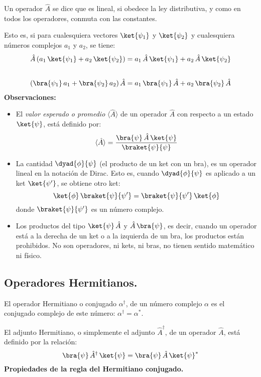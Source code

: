 Un operador $\hat{A}$ se dice que es lineal, si obedece la ley distributiva, y como en todos los operadores, conmuta con las constantes.
\par
Esto es, si para cualesquiera vectores $\ket{\psi_{1}}$ y $\ket{\psi_{2}}$ y cualesquiera números complejos $a_{1}$ y $a_{2}$, se tiene:
\begin{align}
\hat{A} \, (a_{1} \, \ket{\psi_{1}} + a_{2} \, \ket{\psi_{2}}) &= a_{1} \, \hat{A} \, \ket{\psi_{1}} + a_{2} \, \hat{A} \, \ket{\psi_{2}} \label{eq:ecuacion_02_56} \\[1.75em]
( \bra{\psi_{1}} \, a_{1} +  \bra{\psi_{2}} \, a_{2}) \, \hat{A} &= a_{1} \, \bra{\psi_{1}} \, \hat{A} + a_{2} \, \bra{\psi_{2}} \, \hat{A} \label{eq:ecuacion_02_57}
\end{align}
\newpage
\textbf{Observaciones:}
\begin{itemize}
\item El \emph{valor esperado o promedio} $\langle{\hat{A}}\rangle$ de un operador $\hat{A}$ con respecto a un estado $\ket{\psi}$, está definido por:
\begin{equation}
\langle{\hat{A}}\rangle = \dfrac{\bra{\psi} \, \hat{A} \, \ket{\psi}}{\braket{\psi}{\psi}}
\label{eq:ecuacion_02_58}
\end{equation}
\item La cantidad $\dyad{\phi}{\psi}$ (el producto de un ket con un bra), es un operador lineal en la notación de Dirac. Esto es, cuando $\dyad{\phi}{\psi}$ es aplicado a un ket $\ket{\psi^{\prime}}$, se obtiene otro ket:
\begin{equation}
\ket{\phi} \, \braket{\psi}{\psi^{\prime}} =  \braket{\psi}{\psi^{\prime}} \, \ket{\phi}
\label{eq:ecuacion_02_59}
\end{equation}
donde $\braket{\psi}{\psi^{\prime}}$ es un número complejo.
\item Los productos del tipo $\ket{\psi} \, \hat{A}$ y $\hat{A} \, \bra{\psi}$, es decir, cuando un operador está a la derecha de un ket o a la izquierda de un bra, los productos están prohibidos. No son operadores, ni kets, ni bras, no tienen sentido matemático ni físico.
\end{itemize}

\subsection{Operadores Hermitianos.}

El operador Hermitiano o conjugado $\alpha^{\dagger}$, de un número complejo $\alpha$ es el conjugado complejo de este número: $\alpha^{\dagger} = \alpha^{*}$.
\par
El adjunto Hermitiano, o simplemente el adjunto $\hat{A}^{\dagger}$, de un operador $\hat{A}$, está definido por la relación:
\begin{equation}
\bra{\psi} \, \hat{A}^{\dagger} \, \ket{\psi} = \bra{\psi} \, \hat{A} \, \ket{\psi}^{*}
\label{eq:ecuacion_02_60}
\end{equation}
\textbf{Propiedades de la regla del Hermitiano conjugado.}

